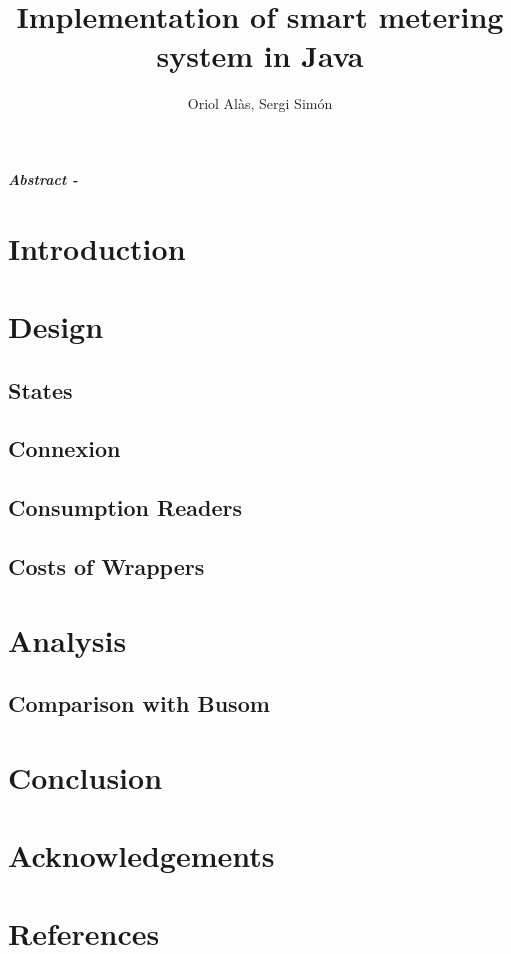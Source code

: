\documentclass{article}
\title{Implementation of smart metering system in Java}
\author{Oriol Alàs, Sergi Simón}
\begin{document}
   \maketitle
   
   \textbf{\textit{Abstract - }}
   \section{Introduction}
   
   \section{Design}
   \subsection{States}
   \subsection{Connexion}
   \subsection{Consumption Readers}
   \subsection{Costs of Wrappers}
   
   \section{Analysis}
   \subsection{Comparison with Busom}
   \section{Conclusion}
   \section{Acknowledgements}
   \section{References}
\end{document}
